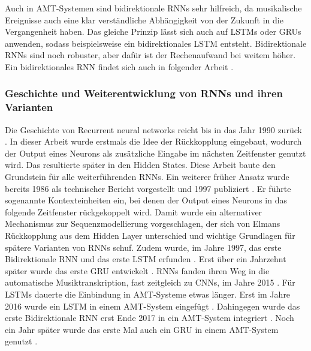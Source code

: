 Auch in AMT-Systemen sind bidirektionale RNNs sehr hilfreich,
da musikalische Ereignisse auch eine klar verständliche Abhängigkeit von der Zukunft in die Vergangenheit haben.
Das gleiche Prinzip lässt sich auch auf LSTMs oder GRUs anwenden,
sodass beispielsweise ein bidirektionales LSTM entsteht.
Bidirektionale RNNs sind noch robuster, aber dafür ist der Rechenaufwand bei weitem höher.
Ein bidirektionales RNN findet sich auch in folgender Arbeit \cite{hawthorne2017onsets}.

\subsubsection{Geschichte und Weiterentwicklung von RNNs und ihren Varianten}
Die Geschichte von Recurrent neural networks reicht bis in das Jahr 1990 zurück \cite{elman1990finding}.
In dieser Arbeit wurde erstmals die Idee der Rückkopplung eingebaut,
wodurch der Output eines Neurons als zusätzliche Eingabe im nächsten Zeitfenster genutzt wird.
Das resultierte später in den Hidden States.
Diese Arbeit baute den Grundstein für alle weiterführenden RNNs.
Ein weiterer früher Ansatz wurde bereits 1986 als technischer Bericht vorgestellt und 1997 publiziert \cite{jordan1997serial}.
Er führte sogenannte Kontexteinheiten ein, bei denen der Output eines Neurons in das folgende Zeitfenster rückgekoppelt wird.
Damit wurde ein alternativer Mechanismus zur Sequenzmodellierung vorgeschlagen,
der sich von Elmans Rückkopplung aus dem Hidden Layer unterschied und wichtige Grundlagen für spätere Varianten von RNNs schuf.
Zudem wurde, im Jahre 1997, das erste Bidirektionale RNN \cite{schuster1997bidirectional}
und das erste LSTM erfunden \cite{hochreiter1997long}.
Erst über ein Jahrzehnt später wurde das erste GRU entwickelt \cite{chung2014empirical}.
RNNs fanden ihren Weg in die automatische Musiktranskription, fast zeitgleich zu CNNs, im Jahre 2015 \cite{sigtia2015hybrid}.
Für LSTMs dauerte die Einbindung in AMT-Systeme etwas länger.
Erst im Jahre 2016 wurde ein LSTM in einem AMT-System eingefügt \cite{sigtia2016end}.
Dahingegen wurde das erste Bidirektionale RNN erst Ende 2017 in ein AMT-System integriert \cite{hawthorne2017onsets}.
Noch ein Jahr später wurde das erste Mal auch ein GRU in einem AMT-System genutzt \cite{jung2018adaptive}.

